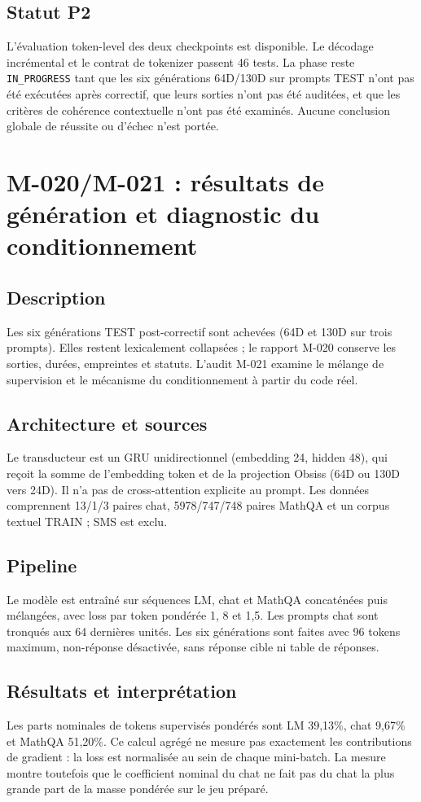 \documentclass[11pt,a4paper]{report}
\begin{document}
\section{Statut P2}
L'évaluation token-level des deux checkpoints est disponible. Le décodage incrémental et le contrat de tokenizer passent 46 tests. La phase reste \texttt{IN\_PROGRESS} tant que les six générations 64D/130D sur prompts TEST n'ont pas été exécutées après correctif, que leurs sorties n'ont pas été auditées, et que les critères de cohérence contextuelle n'ont pas été examinés. Aucune conclusion globale de réussite ou d'échec n'est portée.

\chapter{M-020/M-021 : résultats de génération et diagnostic du conditionnement}
\label{sec:m020-m021}
\section{Description}
Les six générations TEST post-correctif sont achevées (64D et 130D sur trois prompts). Elles restent lexicalement collapsées ; le rapport M-020 conserve les sorties, durées, empreintes et statuts. L'audit M-021 examine le mélange de supervision et le mécanisme du conditionnement à partir du code réel.
\section{Architecture et sources}
Le transducteur est un GRU unidirectionnel (embedding 24, hidden 48), qui reçoit la somme de l'embedding token et de la projection Obsiss (64D ou 130D vers 24D). Il n'a pas de cross-attention explicite au prompt. Les données comprennent 13/1/3 paires chat, 5978/747/748 paires MathQA et un corpus textuel TRAIN ; SMS est exclu.
\section{Pipeline}
Le modèle est entraîné sur séquences LM, chat et MathQA concaténées puis mélangées, avec loss par token pondérée 1, 8 et 1,5. Les prompts chat sont tronqués aux 64 dernières unités. Les six générations sont faites avec 96 tokens maximum, non-réponse désactivée, sans réponse cible ni table de réponses.
\section{Résultats et interprétation}
Les parts nominales de tokens supervisés pondérés sont LM 39,13\%, chat 9,67\% et MathQA 51,20\%. Ce calcul agrégé ne mesure pas exactement les contributions de gradient : la loss est normalisée au sein de chaque mini-batch. La mesure montre toutefois que le coefficient nominal du chat ne fait pas du chat la plus grande part de la masse pondérée sur le jeu préparé.
\end{document}
